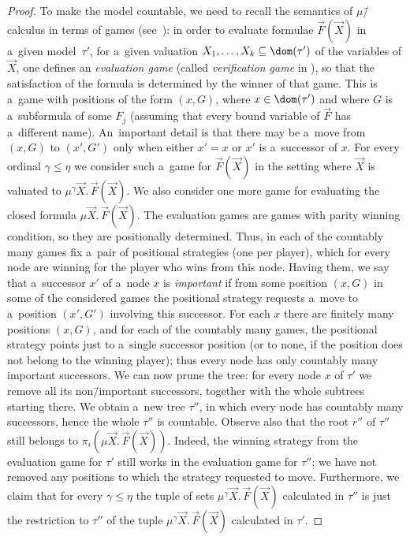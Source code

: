 \documentclass{lmcs}
\numberwithin{equation}{section}
\numberwithin{figure}{section}
\begin{document}
\begin{proof}
	To make the model countable, we need to recall the semantics
	of $\mu$\=/calculus in terms of games (see~\cite[Section 26.2.3]{julian-igor-handook}):
	in order to evaluate formulae $\vec{F}(\vec{X})$ in a~given model~$\tau'$, for a~given valuation $X_1,\dots,X_k\subseteq\dom(\tau')$ of the variables of $\vec{X}$,
	one defines an \emph{evaluation game} (called \emph{verification game} in \cite{julian-igor-handook}), so that
	the satisfaction of the formula is determined by the winner of that game.
	This is a~game with positions of the form $(x,G)$, where $x\in\dom(\tau')$ and where $G$ is a~subformula of some $F_j$
	(assuming that every bound variable of $\vec{F}$ has a~different name).
	An~important detail is that there may be a~move from $(x,G)$ to $(x',G')$ only when either $x'=x$ or $x'$ is a~successor of $x$.
	For every ordinal $\gamma\leq\eta$ we consider such a~game for $\vec{F}(\vec{X})$ in the setting where $\vec{X}$ is valuated to $\mu^\gamma\vec{X}.\,\vec{F}(\vec{X})$.
	We also consider one more game for evaluating the closed formula $\mu\vec{X}.\,\vec{F}(\vec{X})$.
	The evaluation games are games with parity winning condition, so they are positionally determined.
	Thus, in each of the countably many games fix a~pair of positional strategies (one per player), which for every node are winning for the player who wins from this node.
	Having them, we say that a~successor $x'$ of a~node $x$ is \emph{important}
	if from some position $(x,G)$ in some of the considered games the positional strategy requests a~move to a~position $(x',G')$ involving this successor.
	For each $x$ there are finitely many positions $(x,G)$, and for each of the countably many games, the positional strategy points just to a~single successor position
	(or to none, if the position does not belong to the winning player); thus every node has only countably many important successors.
	We can now prune the tree: for every node $x$ of $\tau'$ we remove all its non\=/important successors, together with the whole subtrees starting there.
	We obtain a~new tree $\tau''$, in which every node has countably many successors, hence the whole $\tau''$ is countable.
	Observe also that the root $r''$ of $\tau''$ still belongs to $\pi_i(\mu\vec{X}.\,\vec{F}(\vec{X}))$.
	Indeed, the winning strategy from the evaluation game for $\tau'$ still works in the evaluation game for $\tau''$; we have not removed any positions to which the strategy requested to move.
	Furthermore, we claim that for every $\gamma\leq\eta$ the tuple of sets $\mu^\gamma\vec{X}.\,\vec{F}(\vec{X})$ calculated in $\tau''$
	is just the restriction to $\tau''$ of the tuple $\mu^\gamma\vec{X}.\,\vec{F}(\vec{X})$ calculated in $\tau'$.

\end{proof}
\end{document}
